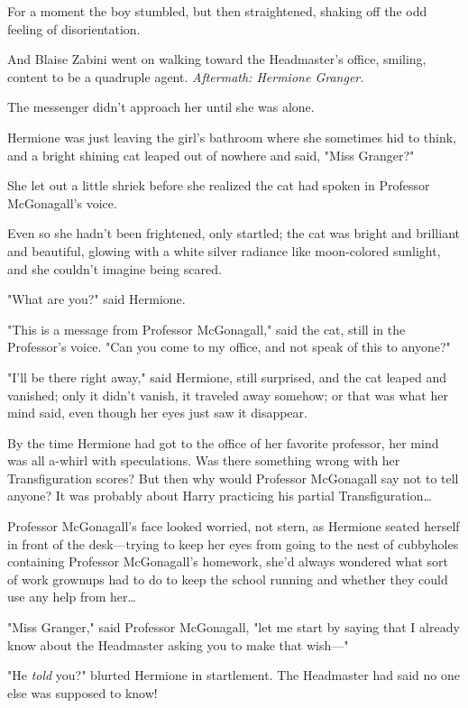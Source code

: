 For a moment the boy stumbled, but then straightened, shaking off the odd 
feeling of disorientation.

And Blaise Zabini went on walking toward the Headmaster's office, smiling, 
content to be a quadruple agent.
\sbreak
\emph{Aftermath: Hermione Granger.}

The messenger didn't approach her until she was alone.

Hermione was just leaving the girl's bathroom where she sometimes hid to think, 
and a bright shining cat leaped out of nowhere and said, "Miss Granger?"

She let out a little shriek before she realized the cat had spoken in Professor 
McGonagall's voice.

Even so she hadn't been frightened, only startled; the cat was bright and 
brilliant and beautiful, glowing with a white silver radiance like moon-colored 
sunlight, and she couldn't imagine being scared.

"What are you?" said Hermione.

"This is a message from Professor McGonagall," said the cat, still in the 
Professor's voice. "Can you come to my office, and not speak of this to anyone?"

"I'll be there right away," said Hermione, still surprised, and the cat leaped 
and vanished; only it didn't vanish, it traveled away somehow; or that was what 
her mind said, even though her eyes just saw it disappear.

By the time Hermione had got to the office of her favorite professor, her mind 
was all a-whirl with speculations. Was there something wrong with her 
Transfiguration scores? But then why would Professor McGonagall say not to tell 
anyone? It was probably about Harry practicing his partial 
Transfiguration{\ldots}

Professor McGonagall's face looked worried, not stern, as Hermione seated 
herself in front of the desk---trying to keep her eyes from going to the nest 
of cubbyholes containing Professor McGonagall's homework, she'd always wondered 
what sort of work grownups had to do to keep the school running and whether 
they could use any help from her{\ldots}

"Miss Granger," said Professor McGonagall, "let me start by saying that I 
already know about the Headmaster asking you to make that wish---"

"He \emph{told} you?" blurted Hermione in startlement. The Headmaster had said 
no one else was supposed to know!


